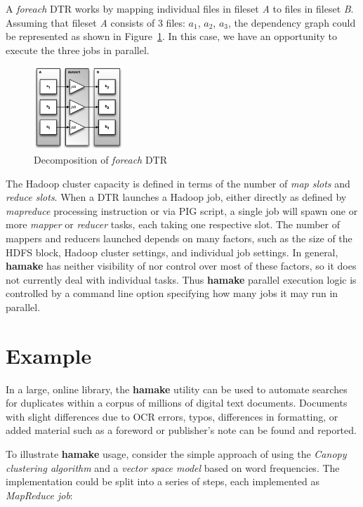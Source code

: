 \documentclass[10pt,conference,letterpaper]{IEEEtran}
\begin{document}
A \emph{foreach} DTR works by mapping individual files in fileset
\textit{A} to files in fileset \textit{B}. Assuming that fileset
\textit{A} consists of 3 files: \textit{$a_1$}, \textit{$a_2$},
\textit{$a_3$}, the dependency graph could be represented as shown
in Figure~\ref{fig:foreach2}. In this case, we have an opportunity to execute the three jobs in parallel.

\begin{figure}[htp]
\centering
\includegraphics[width=0.3\textwidth]{twoforeachp.eps}
\caption{Decomposition of \emph{foreach} DTR}
\label{fig:foreach2}
\end{figure}

The Hadoop cluster capacity is defined in terms of the number of
\textit{map slots} and \textit{reduce slots}. When a DTR launches a
Hadoop job, either directly as defined by \emph{mapreduce} processing instruction or via PIG script, a single job will spawn one or more \emph{mapper} or \emph{reducer} tasks, each taking one respective slot. The number of mappers and reducers launched depends on many factors, such as the size of the HDFS block, Hadoop cluster settings, and individual job settings. In general, \textbf{hamake} has neither visibility of nor control over most of these factors, so it does not currently  deal with individual tasks. Thus \textbf{hamake} parallel
execution logic is controlled by a command line option specifying how many jobs it may run in parallel.

\section{Example}

In a large, online library, the \textbf{hamake} utility can be used to automate searches for duplicates within a corpus of millions of digital text documents. Documents with slight differences due to OCR errors, typos, differences in formatting, or added material such as a foreword or publisher’s note can be found and reported.
 
To illustrate \textbf{hamake} usage, consider the simple approach of using the \textit{Canopy clustering algorithm}\cite{efficientClustering} and a \textit{vector space model}\cite{manning2008introduction} based on word frequencies. The implementation could be split into a series of steps, each implemented as \textit{MapReduce job}:
\end{document}
